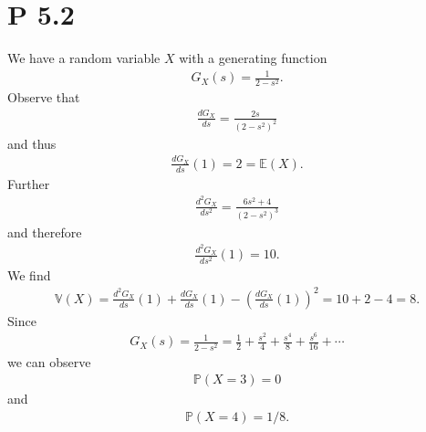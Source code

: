 \documentclass{article}
\renewcommand{\P}{\mathbb{P}}
\newcommand{\E}{\mathbb{E}}
\newcommand{\V}{\mathbb{V}}
\begin{document}
\section*{P 5.2}
We have a random variable $X$ with a generating function 
\begin{align*}
  G_X(s) = \frac{1}{2-s^2}.
\end{align*}
Observe that
\begin{align*}
  \frac{dG_X}{ds} = \frac{2s}{(2-s^2)^2}
\end{align*}
and thus
\begin{align*}
  \frac{dG_X}{ds}(1) = 2 = \E(X).
\end{align*}
Further
\begin{align*}
  \frac{d^2G_X}{ds^2}=\frac{6s^2+4}{(2-s^2)^3}
\end{align*}
and therefore
\begin{align*}
  \frac{d^2G_X}{ds^2}(1) = 10.
\end{align*}
We find
\begin{align*}
  \V(X) = \frac{d^2G_X}{ds}(1) + \frac{dG_X}{ds}(1) - \left(\frac{dG_X}{ds}(1)\right)^2
  = 10 + 2 - 4 = 8.
\end{align*}
Since
\begin{align*}
  G_X(s) = \frac{1}{2-s^2} = \frac{1}{2} + \frac{s^2}{4} + \frac{s^4}{8} + \frac{s^6}{16} + \cdots
\end{align*}
we can observe
\begin{align*}
  \P(X=3) = 0
\end{align*}
and
\begin{align*}
  \P(X=4) = 1/8.
\end{align*}
\end{document}
